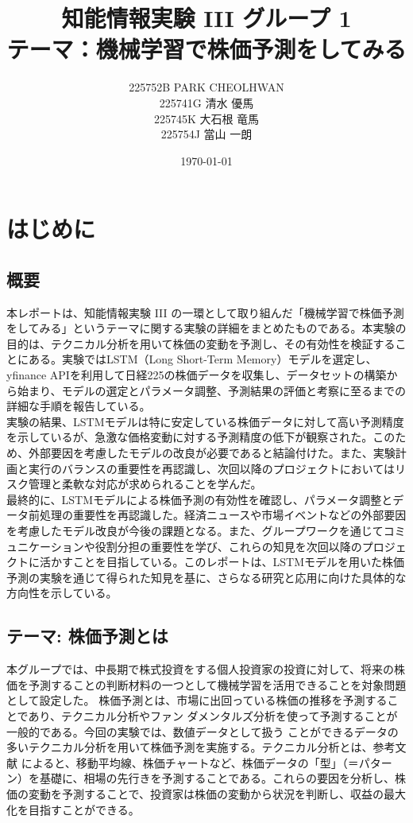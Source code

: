 \documentclass[a4paper, 11pt, titlepage]{jsarticle}
\title{知能情報実験 I\hspace{-1.2pt}I\hspace{-1.2pt}I グループ 1 \\ テーマ：機械学習で株価予測をしてみる}
\author{225752B PARK CHEOLHWAN \\ 225741G 清水 優馬 \\ 225745K 大石根 竜馬 \\ 225754J 當山 一朗}
\date{\today}
\begin{document}
\maketitle
\tableofcontents
\clearpage

\section{はじめに}
\subsection{概要}
\indent 本レポートは、知能情報実験 III の一環として取り組んだ「機械学習で株価予測をしてみる」というテーマに関する実験の詳細をまとめたものである。本実験の目的は、テクニカル分析を用いて株価の変動を予測し、その有効性を検証することにある。実験ではLSTM（Long Short-Term Memory）モデルを選定し、yfinance APIを利用して日経225の株価データを収集し、データセットの構築から始まり、モデルの選定とパラメータ調整、予測結果の評価と考察に至るまでの詳細な手順を報告している。\\
\indent 実験の結果、LSTMモデルは特に安定している株価データに対して高い予測精度を示しているが、急激な価格変動に対する予測精度の低下が観察された。このため、外部要因を考慮したモデルの改良が必要であると結論付けた。また、実験計画と実行のバランスの重要性を再認識し、次回以降のプロジェクトにおいてはリスク管理と柔軟な対応が求められることを学んだ。\\
\indent 最終的に、LSTMモデルによる株価予測の有効性を確認し、パラメータ調整とデータ前処理の重要性を再認識した。経済ニュースや市場イベントなどの外部要因を考慮したモデル改良が今後の課題となる。また、グループワークを通じてコミュニケーションや役割分担の重要性を学び、これらの知見を次回以降のプロジェクトに活かすことを目指している。このレポートは、LSTMモデルを用いた株価予測の実験を通じて得られた知見を基に、さらなる研究と応用に向けた具体的な方向性を示している。

\subsection{テーマ: 株価予測とは}
\indent 本グループでは、中長期で株式投資をする個人投資家の投資に対して、将来の株価を予測することの判断材料の一つとして機械学習を活用できることを対象問題として設定した。 株価予測とは、市場に出回っている株価の推移を予測することであり、テクニカル分析やファン ダメンタルズ分析を使って予測することが一般的である。今回の実験では、数値データとして扱う ことができるデータの多いテクニカル分析を用いて株価予測を実施する。テクニカル分析とは、参考文献 \cite{tech}によると、移動平均線、株価チャートなど、株価データの「型」（＝パターン）を基礎に、相場の先行きを予測することである。これらの要因を分析し、株価の変動を予測することで、投資家は株価の変動から状況を判断し、収益の最大化を目指すことができる。
\end{document}
